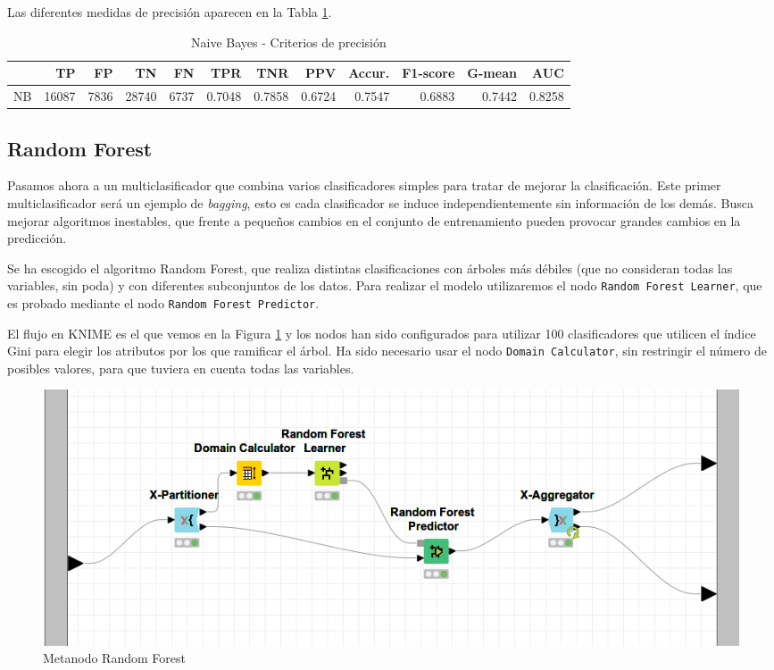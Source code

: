 \documentclass[a4paper, 20pt]{article}
\begin{document}
Las diferentes medidas de precisión aparecen en la Tabla \ref{tab:NaiveBayes}.
\begin{table}[H]
\centering
\caption{Naive Bayes - Criterios de precisión}
\label{tab:NaiveBayes}
\begin{tabular}{lrrrrrrrrrrr}
\toprule
 & TP & FP & TN & FN & TPR & TNR & PPV & Accur. & F1-score & G-mean & AUC\\ \midrule
NB & 16087 & 7836 & 28740 & 6737 & 0.7048 & 0.7858 & 0.6724 & 0.7547 & 0.6883 & 0.7442 & 0.8258\\
\bottomrule
\end{tabular}
\end{table}
\subsection{Random Forest}

Pasamos ahora a un multiclasificador que combina varios clasificadores simples para tratar de mejorar la clasificación. Este primer multiclasificador será un ejemplo de \textit{bagging}, esto es cada clasificador se induce independientemente sin información de los demás. Busca mejorar algoritmos inestables, que frente a pequeños cambios en el conjunto de entrenamiento pueden provocar grandes cambios en la predicción.

Se ha escogido el algoritmo Random Forest, que realiza distintas clasificaciones con árboles más débiles (que no consideran todas las variables, sin poda) y con diferentes subconjuntos de los datos. Para realizar el modelo utilizaremos el nodo \texttt{Random Forest Learner}, que es probado mediante el nodo \texttt{Random Forest Predictor}. 

El flujo en KNIME es el que vemos en la Figura \ref{fig:RandomForest} y los nodos han sido configurados para utilizar 100 clasificadores que utilicen el índice Gini para elegir los atributos por los que ramificar el árbol. Ha sido necesario usar el nodo \texttt{Domain Calculator}, sin restringir el número de posibles valores, para que tuviera en cuenta todas las variables.

\begin{figure}[H]
    \centering
    \includegraphics[width=1\textwidth]{RandomForest}
    \caption{Metanodo Random Forest}
    \label{fig:RandomForest}
\end{figure}
\end{document}
